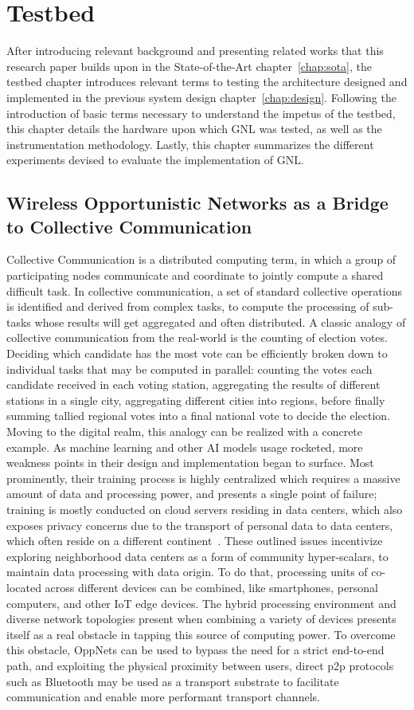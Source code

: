 \chapter{Testbed}
\label{chap:testbed}
After introducing relevant background and presenting related works that this research paper builds upon in the State-of-the-Art chapter~\ref{chap:sota}, the testbed chapter introduces relevant terms to testing the architecture designed and implemented in the previous system design chapter~\ref{chap:design}. Following the introduction of basic terms necessary to understand the impetus of the testbed, this chapter details the hardware upon which GNL was tested, as well as the instrumentation methodology. Lastly, this chapter summarizes the different experiments devised to evaluate the implementation of GNL.

\section{Wireless Opportunistic Networks as a Bridge to Collective Communication}
Collective Communication is a distributed computing term, in which a group of participating nodes communicate and coordinate to jointly compute a shared difficult task. In collective communication, a set of standard collective operations is identified and derived from complex tasks, to compute the processing of sub-tasks whose results will get aggregated and often distributed. A classic analogy of collective communication from the real-world is the counting of election votes. Deciding which candidate has the most vote can be efficiently broken down to individual tasks that may be computed in parallel: counting the votes each candidate received in each voting station, aggregating the results of different stations in a single city, aggregating different cities into regions, before finally summing tallied regional votes into a final national vote to decide the election. Moving to the digital realm, this analogy can be realized with a concrete example. As machine learning and other AI models usage rocketed, more weakness points in their design and implementation began to surface. Most prominently, their training process is highly centralized which requires a massive amount of data and processing power, and presents a single point of failure; training is mostly conducted on cloud servers residing in data centers, which also exposes privacy concerns due to the transport of personal data to data centers, which often reside on a different continent~\cite{Moussa2025}. These outlined issues incentivize exploring neighborhood data centers as a form of community hyper-scalars, to maintain data processing with data origin. To do that, processing units of co-located across different devices can be combined, like smartphones, personal computers, and other IoT edge devices. The hybrid processing environment and diverse network topologies present when combining a variety of devices presents itself as a real obstacle in tapping this source of computing power. To overcome this obstacle, OppNets can be used to bypass the need for a strict end-to-end path, and exploiting the physical proximity between users, direct p2p protocols such as Bluetooth may be used as a transport substrate to facilitate communication and enable more performant transport channels.
